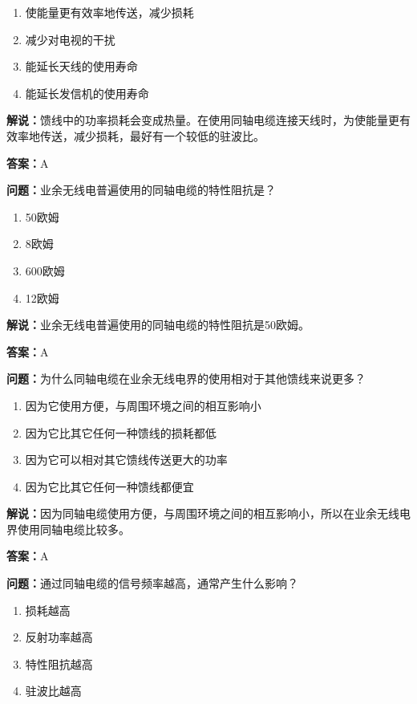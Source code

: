 \begin{enumerate}[label=\Alph*), leftmargin=3em]
	\item 使能量更有效率地传送，减少损耗
	\item 减少对电视的干扰
	\item 能延长天线的使用寿命
	\item 能延长发信机的使用寿命
\end{enumerate}

\textbf{解说：}馈线中的功率损耗会变成热量。在使用同轴电缆连接天线时，为使能量更有效率地传送，减少损耗，最好有一个较低的驻波比。%

\textbf{答案：}A

\textbf{问题：}业余无线电普遍使用的同轴电缆的特性阻抗是？

\begin{enumerate}[label=\Alph*), leftmargin=3em]
	\item 50欧姆
	\item 8欧姆
	\item 600欧姆
	\item 12欧姆
\end{enumerate}

\textbf{解说：}业余无线电普遍使用的同轴电缆的特性阻抗是50欧姆。%

\textbf{答案：}A

\textbf{问题：}为什么同轴电缆在业余无线电界的使用相对于其他馈线来说更多？

\begin{enumerate}[label=\Alph*), leftmargin=3em]
	\item 因为它使用方便，与周围环境之间的相互影响小
	\item 因为它比其它任何一种馈线的损耗都低
	\item 因为它可以相对其它馈线传送更大的功率
	\item 因为它比其它任何一种馈线都便宜
\end{enumerate}

\textbf{解说：}因为同轴电缆使用方便，与周围环境之间的相互影响小，所以在业余无线电界使用同轴电缆比较多。%

\textbf{答案：}A

\textbf{问题：}通过同轴电缆的信号频率越高，通常产生什么影响？

\begin{enumerate}[label=\Alph*), leftmargin=3em]
	\item 损耗越高
	\item 反射功率越高
	\item 特性阻抗越高
	\item 驻波比越高
\end{enumerate}

